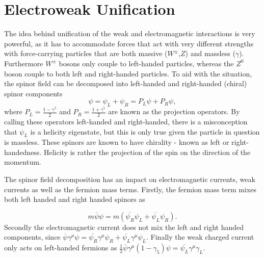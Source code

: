 \section{Electroweak Unification}
\label{weak}
The idea behind unification of the weak and electromagnetic interactions is very powerful, as it has to accommodate forces that act with very different strengths with force-carrying particles that are both massive ($W^{\pm}$,$Z$) and massless ($\gamma$). Furthermore $W^{\pm}$ bosons only couple to left-handed particles, whereas the $Z^{0}$ boson couple to both left and right-handed particles. 
To aid with the situation, the spinor field can be decomposed into left-handed and right-handed (chiral) spinor components
\begin{equation}
	\psi=\psi_{L}+\psi_{R} = P_{L}\psi + P_{R}\psi,
\end{equation}
where $P_{L} =\frac{1-\gamma^{5}}{2}$ and $P_{R}=\frac{1+\gamma^{5}}{2}$ are known as the projection operators. By calling these operators left-handed and right-handed, there is a misconception that $\psi_{L}$ is a helicity eigenstate, but this is only true given the particle in question is massless. These spinors are known to have chirality - known as left or right-handedness. Helicity is rather the projection of the spin on the direction of the momentum.

The spinor field decomposition has an impact on electromagnetic currents, weak currents as well as the fermion mass terms. Firstly, the fermion mass term mixes both left handed and right handed spinors as 

\begin{equation}
	m\overline{\psi}\psi=m(\overline{\psi_{R}}\psi_{L} + \overline{\psi_{L}}\psi_{R}).
\label{eq:mixingpsi}
\end{equation}	
Secondly the electromagnetic current does not mix the left and right handed components, since $\overline{\psi}\gamma^{\mu}\psi=\overline{\psi_{R}}\gamma^{\mu}\psi_{R} + \overline{\psi_{L}}\gamma^{\mu}\psi_{L}$. Finally the weak charged current only acts on left-handed fermions as $\frac{1}{2}\overline{\psi}\gamma^{\mu}(1-\gamma_{5})\psi = \overline{\psi_{L}}\gamma^{\mu}\gamma_{L}$.   


